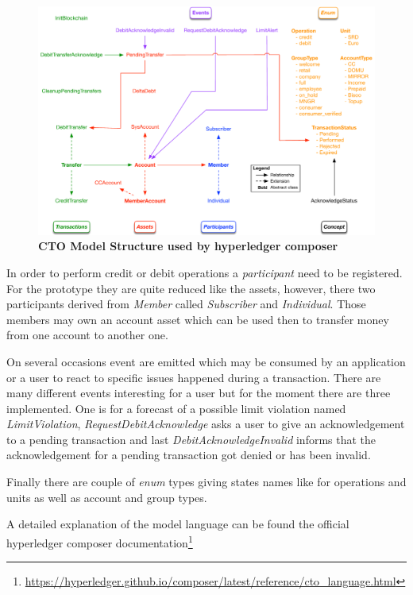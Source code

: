 \begin{figure}[htbp]
  \centering
  \includegraphics[width=1.0\textwidth]{Figures/cto-model}
  \caption{\bf\small CTO Model Structure used by hyperledger composer}
  \label{fig:prototype-net}
\end{figure}

In order to perform credit or debit operations a \textit{participant} need to be registered. For the prototype they are quite reduced like the assets, however, there two participants derived from \textit{Member} called \textit{Subscriber} and \textit{Individual}. Those members may own an account asset which can be used then to transfer money from one account to another one.

On several occasions event are emitted which may be consumed by an application or a user to react to specific issues happened during a transaction. There are many different events interesting for a user but for the moment there are three implemented. One is for a forecast of a possible limit violation named \textit{LimitViolation}, \textit{RequestDebitAcknowledge} asks a user to give an acknowledgement to a pending transaction and last \textit{DebitAcknowledgeInvalid} informs that the acknowledgement for a pending transaction got denied or has been invalid.

Finally there are couple of \textit{enum} types giving states names like for operations and units as well as account and group types.

A detailed explanation of the model language can be found the official hyperledger composer documentation\footnote{\url{https://hyperledger.github.io/composer/latest/reference/cto_language.html}}


